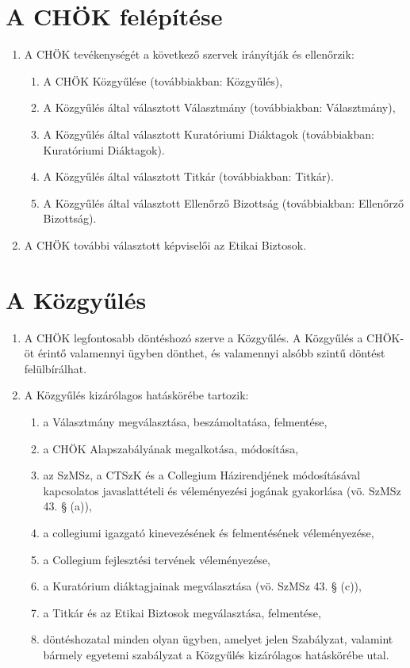 \documentclass{../styles/rulebook}
\begin{document}
\section{A CHÖK felépítése}

\begin{enumerate}
	\item A CHÖK tevékenységét a következő szervek irányítják és ellenőrzik:
	\begin{enumerate}
		\item A CHÖK Közgyűlése (továbbiakban: Közgyűlés),
		\item A Közgyűlés által választott Választmány (továbbiakban: Választmány),
		\item A Közgyűlés által választott Kuratóriumi Diáktagok (továbbiakban: Kuratóriumi Diáktagok).
		\item A Közgyűlés által választott Titkár (továbbiakban: Titkár).
		\item A Közgyűlés által választott Ellenőrző Bizottság (továbbiakban: Ellenőrző Bizottság).
	\end{enumerate}
	\item A CHÖK további választott képviselői az Etikai Biztosok.
\end{enumerate}


\section{A Közgyűlés}

\begin{enumerate}
	\item A CHÖK legfontosabb döntéshozó szerve a Közgyűlés. A Közgyűlés a CHÖK-öt érintő valamennyi ügyben dönthet, és valamennyi alsóbb szintű döntést felülbírálhat.
	\item A Közgyűlés kizárólagos hatáskörébe tartozik:
	\begin{enumerate}
		\item a Választmány megválasztása, beszámoltatása, felmentése,
		\item a CHÖK Alapszabályának megalkotása, módosítása,
		\item az SzMSz, a CTSzK és a Collegium Házirendjének módosításával kapcsolatos javaslattételi és véleményezési jogának gyakorlása (vö. SzMSz 43. § (a)),
		\item a collegiumi igazgató kinevezésének és felmentésének véleményezése,
		\item a Collegium fejlesztési tervének véleményezése,
		\item a Kuratórium diáktagjainak megválasztása (vö. SzMSz 43. § (c)),
		\item a Titkár és az Etikai Biztosok megválasztása, felmentése,
		\item döntéshozatal minden olyan ügyben, amelyet jelen Szabályzat, valamint bármely egyetemi szabályzat a Közgyűlés kizárólagos hatáskörébe utal.
	\end{enumerate}
\end{enumerate}
\end{document}
